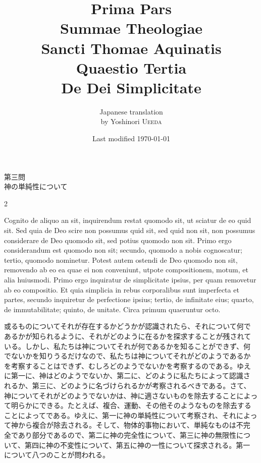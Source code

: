 \documentclass[paper=a4paper,fontsize=10pt,jafontsize=9pt,titlepage]{jlreq}
\title{{\bfseries Prima Pars}\\{\Huge Summae Theologiae}\\Sancti Thomae
Aquinatis\\Quaestio Tertia\\{\bfseries De Dei Simplicitate}}
\author{Japanese translation\\by Yoshinori {\scshape Ueeda}}
\date{Last modified \today}
\begin{document}
\maketitle

\begin{center}
 {\Large 第三問\\神の単純性について}
\end{center}


\begin{paracol}{2}

Cognito de aliquo an sit, inquirendum restat quomodo sit, ut sciatur de
eo quid sit. Sed quia de Deo scire non possumus quid sit, sed quid non
sit, non possumus considerare de Deo quomodo sit, sed potius quomodo non
sit. Primo ergo considerandum est quomodo non sit; secundo, quomodo a
nobis cognoscatur; tertio, quomodo nominetur. Potest autem ostendi de
Deo quomodo non sit, removendo ab eo ea quae ei non conveniunt, utpote
compositionem, motum, et alia huiusmodi. Primo ergo inquiratur de
simplicitate ipsius, per quam removetur ab eo compositio. Et quia
simplicia in rebus corporalibus sunt imperfecta et partes, secundo
inquiretur de perfectione ipsius; tertio, de infinitate eius; quarto, de
immutabilitate; quinto, de unitate. Circa primum quaeruntur octo.

\switchcolumn

或るものについてそれが存在するかどうかが認識されたら、それについて何で
あるかが知られるように、それがどのように在るかを探求することが残されて
いる。しかし、私たちは神についてそれが何であるかを知ることができず、何
でないかを知りうるだけなので、私たちは神についてそれがどのようであるか
を考察することはできず、むしろどのようでないかを考察するのである。ゆえ
に第一に、神はどのようでないか、第二に、どのように私たちによって認識さ
れるか、第三に、どのように名づけられるかが考察されるべきである。さて、
神についてそれがどのようでないかは、神に適さないものを除去することによっ
て明らかにできる。たとえば、複合、運動、その他そのようなものを除去する
ことによってである。ゆえに、第一に神の単純性について考察され、それによっ
て神から複合が除去される。そして、物体的事物において、単純なものは不完
全であり部分であるので、第二に神の完全性について、第三に神の無限性につ
いて、第四に神の不変性について、第五に神の一性について探求される。第一
について八つのことが問われる。

\switchcolumn*


\end{paracol}
\end{document}
